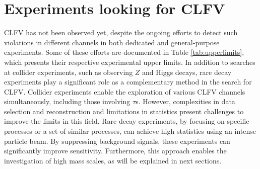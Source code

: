 \section{Experiments looking for CLFV}
CLFV has not been observed yet, despite the ongoing efforts to detect such violations in different channels in both dedicated and general-purpose experiments. 
Some of these efforts are documented in Table \ref{tab:upperlimits}, which presents their respective experimental upper limits. 
In addition to searches at collider experiments, such as observing $Z$ and 
Higgs decays, rare decay experiments play a significant role as a complementary method in the search for CLFV. 
Collider experiments enable the exploration of various CLFV channels simultaneously, including those involving $\tau$s. 
However, complexities in data selection and reconstruction and limitations in statistics present challenges to improve the limits in this field.
Rare decay experiments, by focusing on specific processes or a set of similar processes, can achieve high statistics using an intense particle beam. 
By suppressing background signals, these experiments can significantly improve sensitivity. Furthermore, this approach 
enables the investigation of high mass scales, as will be explained in next sections. 

